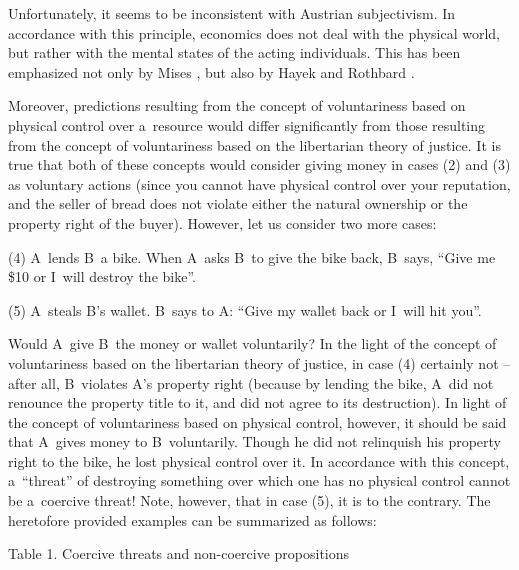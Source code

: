 Unfortunately, it seems to be inconsistent with Austrian subjectivism. In accordance with this principle, economics does not deal with the physical world, but rather with the mental states of the acting individuals. This has been emphasized not only by Mises 
\parencite*[][p.92]{mises_human_1998}, %
 but also by Hayek 
\parencite*[][]{hayek_counter-revolution_1952} %
 and Rothbard 
\parencite*[][p.289]{}.%




Moreover, predictions resulting from the concept of voluntariness based on physical control over a~resource would differ significantly from those resulting from the concept of voluntariness based on the libertarian theory of justice. It is true that both of these concepts would consider giving money in cases (2) and (3) as voluntary actions (since you cannot have physical control over your reputation, and the seller of bread does not violate either the natural ownership or the property right of the buyer). However, let us consider two more cases:



(4) A~lends B~a bike. When A~asks B~to give the bike back, B~says, ``Give me \$10 or I~will destroy the bike''.



(5) A~steals B's wallet. B~says to A: ``Give my wallet back or I~will hit you''.



Would A~give B~the money or wallet voluntarily? In the light of the concept of voluntariness based on the libertarian theory of justice, in case (4) certainly not -- after all, B~violates A's property right (because by lending the bike, A~did not renounce the property title to it, and did not agree to its destruction). In light of the concept of voluntariness based on physical control, however, it should be said that A~gives money to B~voluntarily. Though he did not relinquish his property right to the bike, he lost physical control over it. In accordance with this concept, a~``threat'' of destroying something over which one has no physical control cannot be a~coercive threat! Note, however, that in case (5), it is to the contrary. The heretofore provided examples can be summarized as follows:



Table 1. Coercive threats and non-coercive propositions






